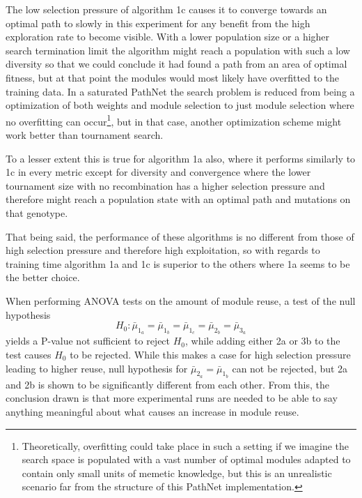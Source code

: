 The low selection pressure of algorithm 1c causes it to converge towards an optimal path to slowly in this experiment for any benefit from the high exploration rate to become visible. With a lower population size or a higher search termination limit the algorithm might reach a population with such a low diversity so that we could conclude it had found a path from an area of optimal fitness, but at that point the modules would most likely have overfitted to the training data. In a saturated PathNet the search problem is reduced from being a optimization of both weights and module selection to just module selection where no overfitting can occur\footnote{Theoretically, overfitting could take place in such a setting if we imagine the search space is populated with a vast number of optimal modules adapted to contain only small units of memetic knowledge, but this is an unrealistic scenario far from the structure of this PathNet implementation.}, but in that case, another optimization scheme might work better than tournament search. 

To a lesser extent this is true for algorithm 1a also, where it performs similarly to 1c in every metric except for diversity and convergence where the lower tournament size with no recombination has a higher selection pressure and therefore might reach a population state with an optimal path and mutations on that genotype.  

That being said, the performance of these algorithms is no different from those of high selection pressure and therefore high exploitation, so with regards to training time algorithm 1a and 1c is superior to the others where 1a seems to be the better choice. 

When performing ANOVA tests on the amount of module reuse, a test of the null hypothesis
\begin{equation*}
    H_{0}:\bar{\mu}_{1_{a}}=\bar{\mu}_{1_{b}}=\bar{\mu}_{1_{c}}=\bar{\mu}_{2_{b}}=\bar{\mu}_{3_{a}}
\end{equation*}
yields a P-value not sufficient to reject \(H_{0}\), while adding either 2a or 3b to the test causes \(H_{0}\) to be rejected. While this makes a case for high selection pressure leading to higher reuse, null hypothesis for \(\bar{\mu}_{2_{a}}=\bar{\mu}_{1_{b}}\) can not be rejected, but 2a and 2b is shown to be significantly different from each other. From this, the conclusion drawn is that more experimental runs are needed to be able to say anything meaningful about what causes an increase in module reuse.

